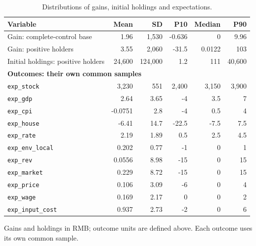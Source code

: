 \documentclass[11pt,letterpaper,english,final]{article}
\begin{document}
\begin{table}[H]
\centering\small
\setlength{\tabcolsep}{4pt}
\caption{Distributions of gains, initial holdings and expectations.}
\begin{tabular}{lrrrrr}
\toprule
Variable & Mean & SD & P10 & Median & P90 \\
\midrule
Gain: complete-control base & 1.96 & 1,530 & -0.636 & 0 & 9.96 \\
Gain: positive holders & 3.55 & 2,060 & -31.5 & 0.0122 & 103 \\
Initial holdings: positive holders & 24,600 & 124,000 & 1.2 & 111 & 40,600 \\
\midrule\multicolumn{6}{l}{\textbf{Outcomes: their own common samples}} \\
\texttt{exp\_stock} & 3,230 & 551 & 2,400 & 3,150 & 3,900 \\
\texttt{exp\_gdp} & 2.64 & 3.65 & -4 & 3.5 & 7 \\
\texttt{exp\_cpi} & -0.0751 & 2.8 & -4 & 0.5 & 4 \\
\texttt{exp\_house} & -6.41 & 14.7 & -22.5 & -7.5 & 7.5 \\
\texttt{exp\_rate} & 2.19 & 1.89 & 0.5 & 2.5 & 4.5 \\
\texttt{exp\_env\_local} & 0.202 & 0.77 & -1 & 0 & 1 \\
\texttt{exp\_rev} & 0.0556 & 8.98 & -15 & 0 & 15 \\
\texttt{exp\_market} & 0.229 & 8.72 & -15 & 0 & 15 \\
\texttt{exp\_price} & 0.106 & 3.09 & -6 & 0 & 4 \\
\texttt{exp\_wage} & 0.169 & 2.17 & 0 & 0 & 2 \\
\texttt{exp\_input\_cost} & 0.937 & 2.73 & -2 & 0 & 6 \\
\bottomrule
\end{tabular}
\par\vspace{4pt}\begin{minipage}{\linewidth}\footnotesize Gains and holdings in RMB; outcome units are defined above. Each outcome uses its own common sample.\end{minipage}
\end{table}
\end{document}
